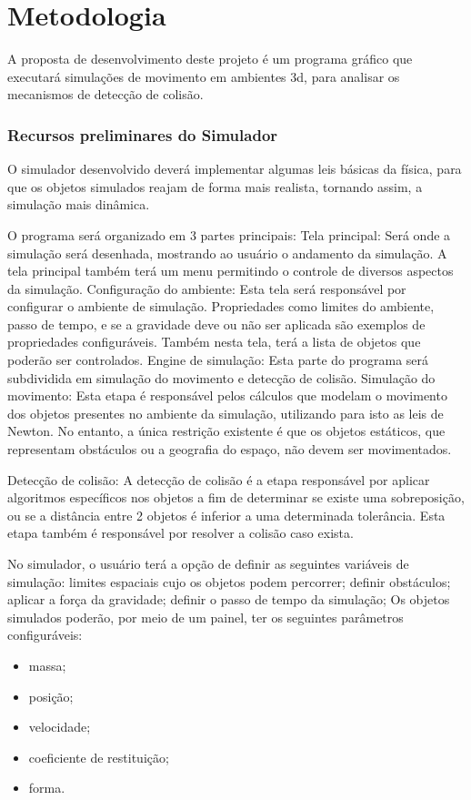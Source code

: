 \section{Metodologia}

A  proposta de desenvolvimento deste projeto é um programa gráfico que
executará simulações de movimento em ambientes 3d, para analisar os mecanismos de detecção de colisão.

\subsubsection{Recursos preliminares do Simulador}
O simulador desenvolvido deverá implementar algumas leis básicas da física, para que os objetos simulados reajam de forma mais realista, tornando assim, a simulação mais dinâmica. 

O programa será organizado em 3 partes principais: 
Tela principal: Será onde a simulação será desenhada, mostrando ao usuário o andamento da simulação. A tela principal também terá um menu permitindo o controle de diversos aspectos da simulação. 
Configuração do ambiente: Esta tela será responsável por configurar o ambiente de simulação. Propriedades como limites do ambiente, passo de tempo, e se a gravidade deve ou não ser aplicada são exemplos de propriedades configuráveis. Também nesta tela, terá a lista de objetos que poderão ser controlados.
Engine de simulação: Esta parte do programa será subdividida em simulação do movimento e detecção de colisão. 
Simulação do movimento: Esta etapa é responsável pelos cálculos que modelam o movimento dos objetos presentes no ambiente da simulação, utilizando para isto as leis de Newton. No entanto, a única restrição existente é que os objetos estáticos, que representam obstáculos ou a geografia do espaço, não devem ser movimentados.

Detecção de colisão: A detecção de colisão é a etapa responsável por aplicar algoritmos específicos nos objetos a fim de determinar se existe uma sobreposição, ou se a distância entre 2 objetos é inferior a uma determinada tolerância. Esta etapa também é responsável por resolver a colisão caso exista. 

No simulador, o usuário terá a opção de definir as seguintes variáveis de simulação:
limites espaciais cujo os objetos podem percorrer; 
definir obstáculos; 
aplicar a força da gravidade; 
definir o passo de tempo da simulação; 
Os objetos simulados poderão, por meio de um painel, ter os seguintes parâmetros configuráveis: 
\begin{itemize}
\item massa; 
\item posição;
\item velocidade;
\item coeficiente de restituição;
\item forma. 
\end{itemize}

